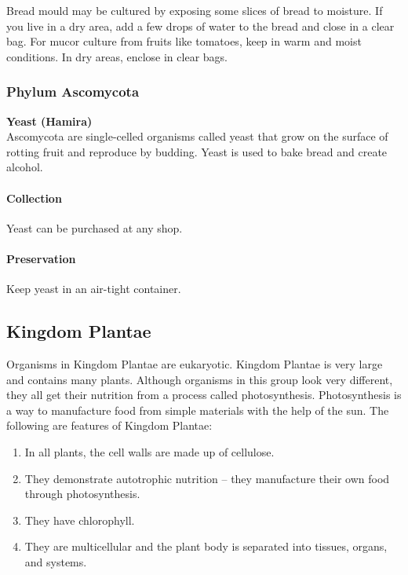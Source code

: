\begin{multicols}{2}
Bread mould may be cultured by exposing some slices of bread to moisture. If you live in a dry area, add a few drops of water to the bread and close in a clear bag.
For mucor culture from fruits like tomatoes, keep in warm and moist conditions. In dry areas, enclose in clear bags. 

\subsubsection{Phylum Ascomycota}

\textbf{Yeast (Hamira)}\\
Ascomycota are single-celled organisms called yeast that grow on the surface of rotting fruit and reproduce by budding. Yeast is used to bake bread and create alcohol.

\paragraph{Collection}
Yeast can be purchased at any shop.

\paragraph{Preservation} 
Keep yeast in an air-tight container.

\end{multicols}

\pagebreak

\subsection{Kingdom Plantae} 
Organisms in Kingdom Plantae are eukaryotic. Kingdom Plantae is very large and contains many plants.
Although organisms in this group look very different, they all get their nutrition from a process called photosynthesis. Photosynthesis is a way to manufacture food from simple materials with the help of the sun.
 The following are features of Kingdom Plantae:
\begin{enumerate}
\item{In all plants, the cell walls are made up of cellulose.}
\item{They demonstrate autotrophic nutrition -- they manufacture their own food through photosynthesis.}
\item{They have chlorophyll.}
\item{They are multicellular and the plant body is separated into tissues, organs, and systems.}
\end{enumerate}

